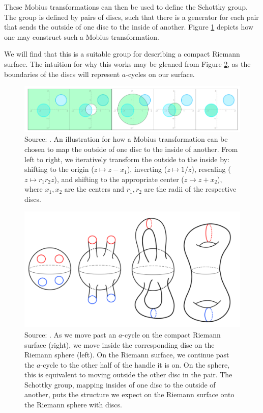 These Mobius transformations can then be used to define the Schottky group.
The group is defined by pairs of discs, such that there is a generator for each pair that sends the outside of one disc to the inside of another.
Figure \ref{figB12:MobiusIllustration} depicts how one may construct such a Mobius transformation.

We will find that this is a suitable group for describing a compact Riemann surface. The intuition for why this works may be gleaned from Figure \ref{figB12:SchottkyIntuition}, as the boundaries of the discs will represent $a$-cycles on our surface.

\begin{figure}
    \center
    \includegraphics[width=\textwidth]{assets/ChanSchottkyGroup.png}
    \caption{
        Source: \cite{Cha22}.
        An illustration for how a Mobius transformation can be chosen to map the outside of one disc to the inside of another.
        From left to right, we iteratively transform the outside to the inside by:
        shifting to the origin ($z \mapsto z-x_1$), inverting ($z \mapsto 1/z$), rescaling ($z \mapsto r_1r_2 z$), and shifting to the appropriate center ($z \mapsto z+x_2$), 
        where $x_1,x_2$ are the centers and $r_1,r_2$ are the radii of the respective discs.
    }
    \label{figB12:MobiusIllustration}
\end{figure}

\begin{figure}
    \center
    \includegraphics{assets/ChanSchottkyCover.png}
    \caption{
        Source: \cite{Cha22}.
        As we move past an $a$-cycle on the compact Riemann surface (right), we move inside the corresponding disc on the Riemann sphere (left).
        On the Riemann surface, we continue past the $a$-cycle to the other half of the handle it is on.
        On the sphere, this is equivalent to moving outside the other disc in the pair.
        The Schottky group, mapping insides of one disc to the outside of another, puts the structure we expect on the Riemann surface onto the Riemann sphere with discs.
    }
    \label{figB12:SchottkyIntuition}
\end{figure}

